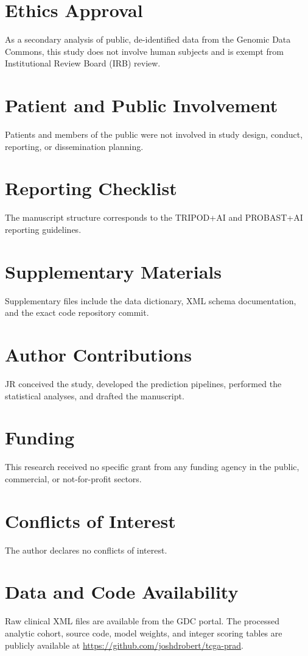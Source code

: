 \documentclass[11pt]{article}
\begin{document}
\section*{Ethics Approval}
As a secondary analysis of public, de-identified data from the Genomic Data Commons, this study does not involve human subjects and is exempt from Institutional Review Board (IRB) review.

\section*{Patient and Public Involvement}
Patients and members of the public were not involved in study design, conduct, reporting, or dissemination planning.

\section*{Reporting Checklist}
The manuscript structure corresponds to the TRIPOD+AI and PROBAST+AI reporting guidelines.

\section*{Supplementary Materials}
Supplementary files include the data dictionary, XML schema documentation, and the exact code repository commit.

\section*{Author Contributions}
JR conceived the study, developed the prediction pipelines, performed the statistical analyses, and drafted the manuscript.

\section*{Funding}
This research received no specific grant from any funding agency in the public, commercial, or not-for-profit sectors.

\section*{Conflicts of Interest}
The author declares no conflicts of interest.

\section*{Data and Code Availability}
Raw clinical XML files are available from the GDC portal. The processed analytic cohort, source code, model weights, and integer scoring tables are publicly available at \url{https://github.com/joshdrobert/tcga-prad}.
\end{document}
